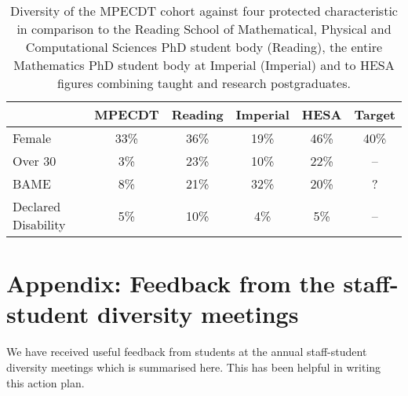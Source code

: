 \documentclass[12pt]{article}
\begin{document}
\begin{enumerate}
\begin{table} \centering
\begin{tabular}{l|c|c|c|c|c}
        & MPECDT & Reading & Imperial & HESA & Target\\ \hline\hline
Female  & 33\% & 36\% & 19\% & 46\% & 40\% \\
Over 30 & 3\%  & 23\% & 10\% & 22\% & -- \\
BAME    & 8\%  & 21\% & 32\% & 20\% & ? \\
Declared Disability & 5\%  & 10\% & 4\%  & 5\%  & -- \\
\end{tabular}
\caption{Diversity of the MPECDT cohort against four protected characteristic in comparison to the Reading School of Mathematical, Physical and Computational Sciences PhD student body (Reading), the entire Mathematics PhD student body at Imperial (Imperial) and to HESA figures combining taught and research postgraduates. \label{tab:protectedCharStats}}
\end{table}

\end{enumerate} 

\appendix
\section*{Appendix: Feedback from the staff-student diversity meetings}

We have received useful feedback from students at the annual staff-student diversity meetings which is summarised here. This has been helpful in writing this action plan.
\end{document}
